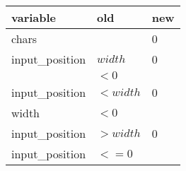 \begin{table}
\centering
\begin{tabular}{|l|l|l|}
\hline
\textbf{variable}  & \textbf{old} & \textbf{new} \\
\hline
chars              &              &   0          \\
input\_position    & $width$      &   0          \\
                   & $< 0$        &              \\
\hline
input\_position    & $< width$    & 0            \\
width              &  $< 0$       &              \\
\hline
input\_position    & $> width$    & 0              \\
input\_position    & $<= 0$       &              \\
\hline
\end{tabular}
\end{table}
